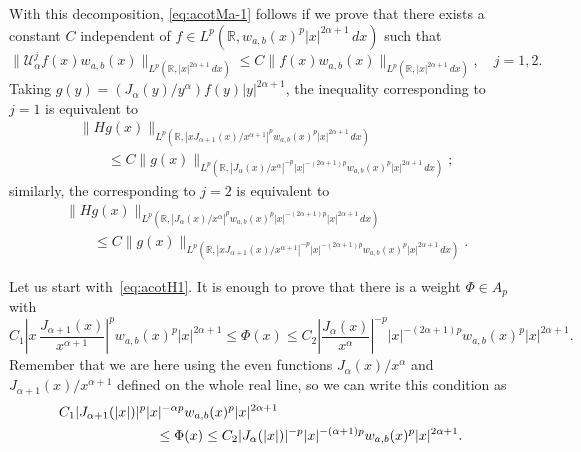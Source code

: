 \documentclass[a4paper]{amsart}
\numberwithin{equation}{section}
\theoremstyle{plain}
\theoremstyle{remark}
\newcommand{\R}{\mathbb{R}}
\newcommand{\Ua}{\mathcal{U}_\alpha} %
\begin{document}
With this decomposition, \eqref{eq:acotMa-1} follows if we prove that there exists a constant $C$ independent of $f \in L^p(\R,w_{a,b}(x)^p|x|^{2\alpha+1}\,dx)$ such that
$$
  \| \Ua^j f(x) w_{a,b}(x) \|_{L^p(\R,|x|^{2\alpha+1}\,dx)}
  \le C \| f(x) w_{a,b}(x) \|_{L^p(\R,|x|^{2\alpha+1}\,dx)},
  \quad j=1,2.
$$
Taking $g(y) = (J_{\alpha}(y)/y^{\alpha}) f(y) |y|^{2\alpha+1}$, the inequality corresponding to $j=1$ is equivalent to
\begin{equation}
\label{eq:acotH1}
\begin{aligned}
  &\| H g(x) \|_{L^p(\R, |xJ_{\alpha+1}(x)/x^{\alpha+1}|^p 
    w_{a,b}(x)^p |x|^{2\alpha+1}\,dx)} \\
  &\qquad
  \le C \| g(x) \|_{L^p(\R, |J_{\alpha}(x)/x^{\alpha}|^{-p} |x|^{-(2\alpha+1)p}
    w_{a,b}(x)^p |x|^{2\alpha+1}\,dx)};
\end{aligned}
\end{equation}
similarly, the corresponding to $j=2$ is equivalent to
\begin{equation}
\label{eq:acotH2}
\begin{aligned}
  &\| H g(x) \|_{L^p(\R, |J_{\alpha}(x)/x^{\alpha}|^p
    w_{a,b}(x)^p |x|^{-(2\alpha+1)p} |x|^{2\alpha+1}\,dx)} \\
  &\qquad
  \le C \| g(x) \|_{L^p(\R, |xJ_{\alpha+1}(x)/x^{\alpha+1}|^{-p} |x|^{-(2\alpha+1)p}
    w_{a,b}(x)^p |x|^{2\alpha+1}\,dx)}.
\end{aligned}
\end{equation}

Let us start with~\eqref{eq:acotH1}. It is enough to prove that there is a weight $\Phi \in A_p$ with
\begin{equation*}
   C_1 \left|x \, \frac{J_{\alpha+1}(x)}{x^{\alpha+1}}\right|^p w_{a,b}(x)^p |x|^{2\alpha+1}
   \le \Phi(x) \le
   C_2 \left|\frac{J_{\alpha}(x)}{x^{\alpha}}\right|^{-p} |x|^{-(2\alpha+1)p} w_{a,b}(x)^p |x|^{2\alpha+1}.
\end{equation*}
Remember that we are here using the even functions $J_\alpha(x)/x^\alpha$ and $J_{\alpha+1}(x)/x^{\alpha+1}$ defined on the whole
real line, so we can write this condition as
\begin{equation}
\label{eq:acotPhi}
\begin{aligned}
   &C_1 |J_{\alpha+1}(|x|)|^p |x|^{-\alpha p} w_{a,b}(x)^p |x|^{2\alpha+1} \\
   &\hspace{0.2\textwidth}\null\le \Phi(x) \le
   C_2 |J_{\alpha}(|x|)|^{-p} |x|^{-(\alpha+1)p} w_{a,b}(x)^p |x|^{2\alpha+1}.
\end{aligned}
\end{equation}
\end{document}
